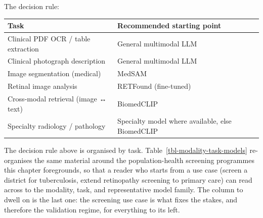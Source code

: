 \documentclass[
  letterpaper,
  11pt]{scrbook}
\newcounter{none} %
\begin{document}
The decision rule:

{\def\LTcaptype{none} %
\begin{longtable}[]{@{}
  >{\raggedright\arraybackslash}p{}
  >{\raggedright\arraybackslash}p{}@{}}
\toprule\noalign{}
\begin{minipage}[b]{\linewidth}\raggedright
Task
\end{minipage} & \begin{minipage}[b]{\linewidth}\raggedright
Recommended starting point
\end{minipage} \\
\midrule\noalign{}
\endhead
\bottomrule\noalign{}
\endlastfoot
Clinical PDF OCR / table extraction & General multimodal LLM \\
Clinical photograph description & General multimodal LLM \\
Image segmentation (medical) & MedSAM \\
Retinal image analysis & RETFound (fine-tuned) \\
Cross-modal retrieval (image ↔ text) & BiomedCLIP \\
Specialty radiology / pathology & Specialty model where available, else
BiomedCLIP \\
\end{longtable}
}

The decision rule above is organised by task.
Table~\ref{tbl-modality-task-models} re-organises the same material
around the population-health screening programmes this chapter
foregrounds, so that a reader who starts from a use case (screen a
district for tuberculosis, extend retinopathy screening to primary care)
can read across to the modality, task, and representative model family.
The column to dwell on is the last one: the screening use case is what
fixes the stakes, and therefore the validation regime, for everything to
its left.
\end{document}
